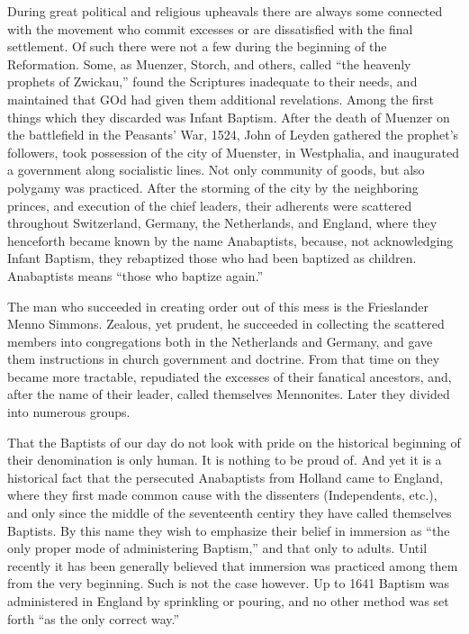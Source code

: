 \documentclass[
]{book}
\begin{document}
During great political and religious upheavals there are always some connected with the movement who commit excesses or are dissatisfied with the final settlement. Of such there were not a few during the beginning of the Reformation. Some, as Muenzer, Storch, and others, called ``the heavenly prophets of Zwickau,'' found the Scriptures inadequate to their needs, and maintained that GOd had given them additional revelations. Among the first things which they discarded was Infant Baptism. After the death of Muenzer on the battlefield in the Peasants' War, 1524, John of Leyden gathered the prophet's followers, took possession of the city of Muenster, in Westphalia, and inaugurated a government along socialistic lines. Not only community of goods, but also polygamy was practiced. After the storming of the city by the neighboring princes, and execution of the chief leaders, their adherents were scattered throughout Switzerland, Germany, the Netherlands, and England, where they henceforth became known by the name Anabaptists, because, not acknowledging Infant Baptism, they rebaptized those who had been baptized as children. Anabaptists means ``those who baptize again.''

The man who succeeded in creating order out of this mess is the Frieslander Menno Simmons. Zealous, yet prudent, he succeeded in collecting the scattered members into congregations both in the Netherlands and Germany, and gave them instructions in church government and doctrine. From that time on they became more tractable, repudiated the excesses of their fanatical ancestors, and, after the name of their leader, called themselves Mennonites. Later they divided into numerous groups.

That the Baptists of our day do not look with pride on the historical beginning of their denomination is only human. It is nothing to be proud of. And yet it is a historical fact that the persecuted Anabaptists from Holland came to England, where they first made common cause with the dissenters (Independents, etc.), and only since the middle of the seventeenth centiry they have called themselves Baptists. By this name they wish to emphasize their belief in immersion as ``the only proper mode of administering Baptism,'' and that only to adults. Until recently it has been generally believed that immersion was practiced among them from the very beginning. Such is not the case however. Up to 1641 Baptism was administered in England by sprinkling or pouring, and no other method was set forth ``as the only correct way.''
\end{document}
